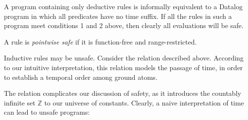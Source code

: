 
A \slang program containing only deductive rules is informally equivalent to a
Datalog program in which all predicates have no time suffix.  If all the rules
in such a program meet conditions 1 and 2 above, then clearly all
evaluations will be safe.

\begin{definition}
A \slang rule is \emph{pointwise safe} if it is function-free and range-restricted.
\end{definition}

Inductive rules may be unsafe.  Consider the  relation described above.  According to our
intuitive interpretation, this relation models the passage of time, in order to
establish a temporal order among ground atoms. 

The  relation complicates our discussion of safety, as it
introduces the countably infinite set $\mathbb{Z}$ to our
universe of constants.
Clearly, a naive interpretation of time can lead to unsafe programs:







